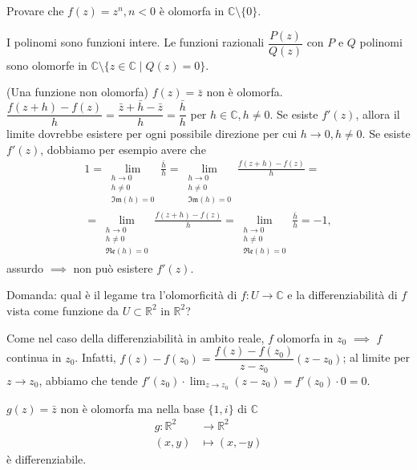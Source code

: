 \begin{exc}
  Provare che $f(z)=z^n, n<0$ è olomorfa in $\mathbb{C}\setminus\{0\}$.
\end{exc}

\begin{oss}
  I polinomi sono funzioni intere. Le funzioni razionali $\dfrac{P(z)}{Q(z)}$ con $P$ e $Q$ polinomi sono olomorfe in $\mathbb{C} \setminus \{z \in \mathbb{C} \mid Q(z)=0\}$.
\end{oss}

\begin{ex}
  (Una funzione non olomorfa) $f(z)=\bar{z}$ non è olomorfa. $\dfrac{f(z+h)-f(z)}{h}=\dfrac{\bar{z}+\bar{h}-\bar{z}}{h}=\dfrac{\bar{h}}{h}$ per $h \in \mathbb{C}, h \not=0$. Se esiste $f'(z)$, allora il limite dovrebbe esistere per ogni possibile direzione per cui $h \longrightarrow 0, h\not=0$. Se esiste $f'(z)$, dobbiamo per esempio avere che
  \begin{align*}
    1=\lim_{\substack{h \longrightarrow 0 \\ h\not=0 \\ \mathfrak{Im}(h)=0}} \frac{\bar{h}}{h}=\lim_{\substack{h \longrightarrow 0 \\ h\not=0 \\ \mathfrak{Im}(h)=0}} \frac{f(z+h)-f(z)}{h}=\\
    =\lim_{\substack{h \longrightarrow 0 \\ h\not=0 \\ \mathfrak{Re}(h)=0}} \frac{f(z+h)-f(z)}{h}=\lim_{\substack{h \longrightarrow 0 \\ h\not=0 \\ \mathfrak{Re}(h)=0}} \frac{\bar{h}}{h}=-1,
  \end{align*}
  assurdo $\implies$ non può esistere $f'(z)$.
\end{ex}

Domanda: qual è il legame tra l'olomorficità di $f:U \longrightarrow \mathbb{C}$ e la differenziabilità di $f$ vista come funzione da $U \subset \mathbb{R}^2$ in $\mathbb{R}^2$?

\begin{oss}
  Come nel caso della differenziabilità in ambito reale, $f$ olomorfa in $z_0$ $\implies$ $f$ continua in $z_0$. Infatti, $f(z)-f(z_0)=\dfrac{f(z)-f(z_0)}{z-z_0}(z-z_0)$; al limite per $z \longrightarrow z_0$, abbiamo che tende  $\displaystyle f'(z_0) \cdot \lim_{z \longrightarrow z_0} (z-z_0)=f'(z_0) \cdot 0=0$.
\end{oss}

\begin{ex}
  $g(z)=\bar{z}$ non è olomorfa ma nella base $\{1, i\}$ di $\mathbb{C}$
  \begin{align*}
    g: \mathbb{R}^2 &\longrightarrow \mathbb{R}^2\\
    (x, y) &\longmapsto (x, -y)
  \end{align*}
   è differenziabile.
\end{ex}

